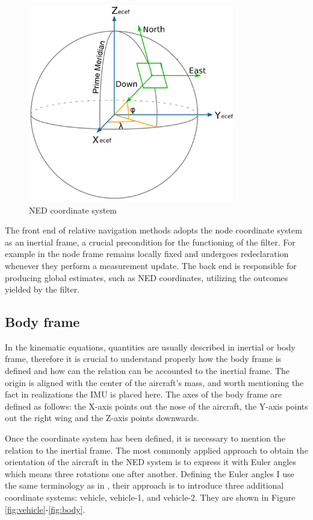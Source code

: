 \begin{figure}[!ht]
    \centering
    \includegraphics[width=0.8\textwidth]{figures/NED.png}
    \caption{NED coordinate system \cite{gps_navigation_slide}}
    \label{fig:NED}
\end{figure}

The front end of relative navigation methods adopts the node coordinate system as an inertial frame, a crucial precondition for the functioning of the filter. For example in \cite{rel-nav} the node frame remains locally fixed and undergoes redeclaration whenever they perform a measurement update. The back end is responsible for producing global estimates, such as NED coordinates, utilizing the outcomes yielded by the filter.

\subsection{Body frame}

In the kinematic equations, quantities are usually described in inertial or body frame, therefore it is crucial to understand properly how the body frame is defined and how can the relation can be accounted to the inertial frame. The origin is aligned with the center of the aircraft's mass, and worth mentioning the fact in realizations the IMU is placed here. The axes of the body frame are defined as follows: the X-axis points out the nose of the aircraft, the Y-axis points out the right wing and the Z-axis points downwards.

Once the coordinate system has been defined, it is necessary to mention the relation to the inertial frame. The most commonly applied approach to obtain the orientation of the aircraft in the NED system is to express it with Euler angles which means three rotations one after another. Defining the Euler angles I use the same terminology as in \cite{EKF-UAS-2}, their approach is to introduce three additional coordinate systems: vehicle, vehicle-1, and vehicle-2. They are shown in Figure \ref{fig:vehicle}-\ref{fig:body}.

